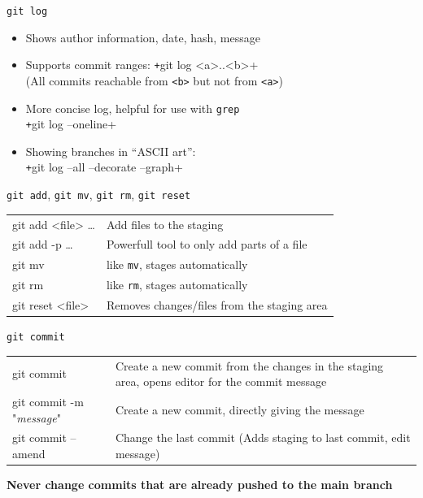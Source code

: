 \begin{frame}[c, fragile]{\texttt{git log}}
  \begin{itemize}
    \item Shows author information, date, hash, message
    \item Supports commit ranges: \texttt+git log <a>..<b>+ \\
      (All commits reachable from \texttt{<b>} but not from \texttt{<a>})
    \item More concise log, helpful for use with \texttt{grep} \\
      \texttt+git log --oneline+
    \item Showing branches in \enquote{ASCII art}: \\
      \texttt+git log --all --decorate --graph+
  \end{itemize}
\end{frame}

\begin{frame}{\texttt{git add}, \texttt{git mv}, \texttt{git rm}, \texttt{git reset}}
  \begin{tabu}{>{\ttfamily}l X[,L]}
    git add <file> … & Add files to the staging \\
    git add -p …     & Powerfull tool to only add parts of a file \\
    git mv           & like \texttt{mv}, stages automatically \\
    git rm           & like \texttt{rm}, stages automatically \\
    git reset <file> & Removes changes/files from the staging area
  \end{tabu}
\end{frame}

\begin{frame}{\texttt{git commit}}
  \begin{tabu}{>{\ttfamily}l X[,L]}
    git commit                       & Create a new commit from the changes in the staging area, opens editor for the commit message \\
    git commit -m "\textit{message}" & Create a new commit, directly giving the message \\
    git commit --amend               & Change the last commit (Adds staging to last commit, edit message)
  \end{tabu}
  \alert{\bfseries Never change commits that are already pushed to the main branch} 
\end{frame}

